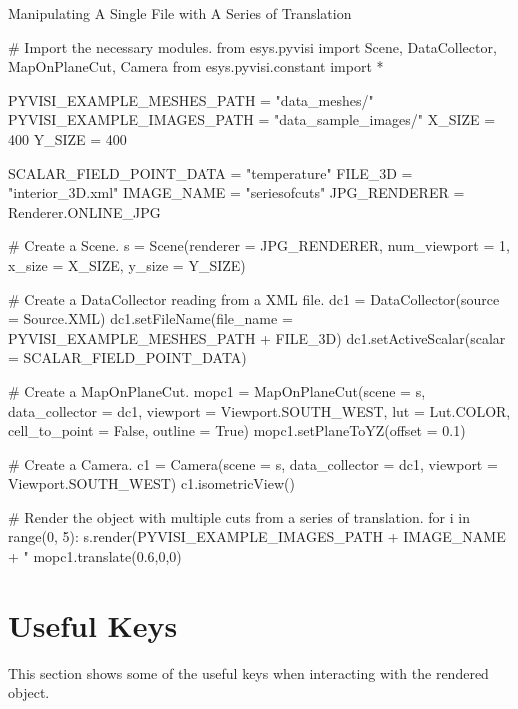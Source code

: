 \textsf{Manipulating A Single File with A Series of Translation}

\begin{python}
# Import the necessary modules.
from esys.pyvisi import Scene, DataCollector, MapOnPlaneCut, Camera
from esys.pyvisi.constant import *

PYVISI_EXAMPLE_MESHES_PATH = "data_meshes/"
PYVISI_EXAMPLE_IMAGES_PATH = "data_sample_images/"
X_SIZE = 400
Y_SIZE = 400

SCALAR_FIELD_POINT_DATA = "temperature"
FILE_3D = "interior_3D.xml"
IMAGE_NAME = "seriesofcuts"
JPG_RENDERER = Renderer.ONLINE_JPG


# Create a Scene.
s = Scene(renderer = JPG_RENDERER, num_viewport = 1, x_size = X_SIZE, 
        y_size = Y_SIZE)

# Create a DataCollector reading from a XML file.
dc1 = DataCollector(source = Source.XML)
dc1.setFileName(file_name = PYVISI_EXAMPLE_MESHES_PATH + FILE_3D)
dc1.setActiveScalar(scalar = SCALAR_FIELD_POINT_DATA)

# Create a MapOnPlaneCut.
mopc1 = MapOnPlaneCut(scene = s, data_collector = dc1, 
        viewport = Viewport.SOUTH_WEST, lut = Lut.COLOR, cell_to_point = False,
        outline = True)
mopc1.setPlaneToYZ(offset = 0.1)

# Create a Camera.
c1 = Camera(scene = s, data_collector = dc1, viewport = Viewport.SOUTH_WEST)
c1.isometricView()

# Render the object with multiple cuts from a series of translation.
for i in range(0, 5):
    s.render(PYVISI_EXAMPLE_IMAGES_PATH + IMAGE_NAME + "%
    mopc1.translate(0.6,0,0)
\end{python}

\section{Useful Keys}
This section shows some of the useful keys when interacting with the rendered
object.

